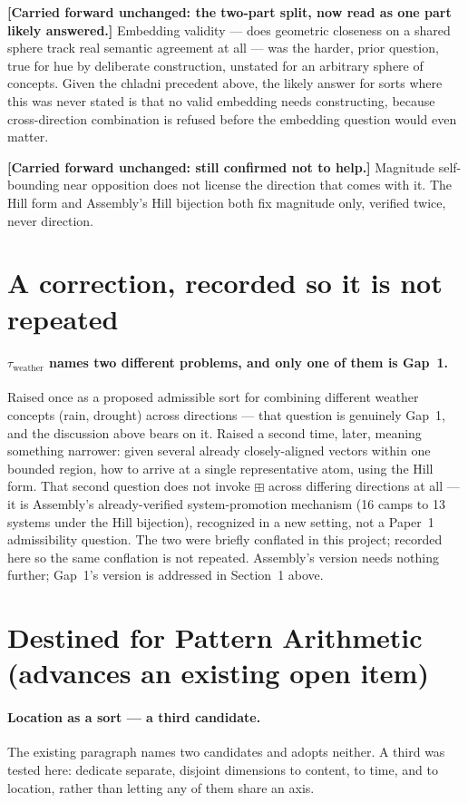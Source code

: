 \documentclass[11pt]{article}
\begin{document}
\textbf{[Carried forward unchanged: the two-part split, now read as
one part likely answered.]} Embedding validity --- does geometric
closeness on a shared sphere track real semantic agreement at all ---
was the harder, prior question, true for hue by deliberate
construction, unstated for an arbitrary sphere of concepts. Given the
chladni precedent above, the likely answer for sorts where this was
never stated is that no valid embedding needs constructing, because
cross-direction combination is refused before the embedding question
would even matter.

\textbf{[Carried forward unchanged: still confirmed not to help.]}
Magnitude self-bounding near opposition does not license the
direction that comes with it. The Hill form and Assembly's Hill
bijection both fix magnitude only, verified twice, never direction.

\section{A correction, recorded so it is not repeated}

\paragraph{$\tau_{\text{weather}}$ names two different problems, and
only one of them is Gap~1.} Raised once as a proposed admissible sort
for combining different weather concepts (rain, drought) across
directions --- that question is genuinely Gap~1, and the discussion
above bears on it. Raised a second time, later, meaning something
narrower: given several already closely-aligned vectors within one
bounded region, how to arrive at a single representative atom, using
the Hill form. That second question does not invoke $\boxplus$ across
differing directions at all --- it is Assembly's already-verified
system-promotion mechanism (16 camps to 13 systems under the Hill
bijection), recognized in a new setting, not a Paper~1 admissibility
question. The two were briefly conflated in this project; recorded
here so the same conflation is not repeated. Assembly's version needs
nothing further; Gap~1's version is addressed in Section~1 above.

\section{Destined for Pattern Arithmetic (advances an existing open item)}

\paragraph{Location as a sort --- a third candidate.} The existing
paragraph names two candidates and adopts neither. A third was tested
here: dedicate separate, disjoint dimensions to content, to time, and
to location, rather than letting any of them share an axis.
\end{document}
